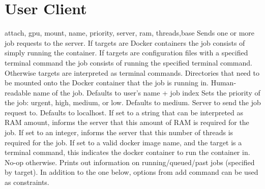 \section{User Client}
{attach, gpu, mount, name, priority, server, ram, threads,base}
{Sends one or more job requests to the server.
If targets are Docker containers the job consists of simply running the container.
If targets are configuration files with a specified terminal command the job consists of running the specified terminal command.
Otherwise targets are interpreted as terminal commands.
}
\jaoptionheader
{}
{Directories that need to be mounted onto the Docker container that the job is running in.}
{Human-readable name of the job.
Defaults to user's name + job index}
{Sets the priority of the job: urgent, high, medium, or low.
Defaults to medium.}
{Server to send the job request to.
Defaults to localhost.}
{If set to a string that can be interpreted as RAM amount, informs the server that this amount of RAM is required for the job.}
{If set to an integer, informs the server that this number of threads is required for the job.}
{If set to a valid docker image name, and the target is a terminal command, this indicates the docker container to run the container in.
No-op otherwise.}
{Prints out information on running/queued/past jobs (specified by target).
In addition to the one below, options from add command can be used as constraints.}
\jaoptionheader
{}
